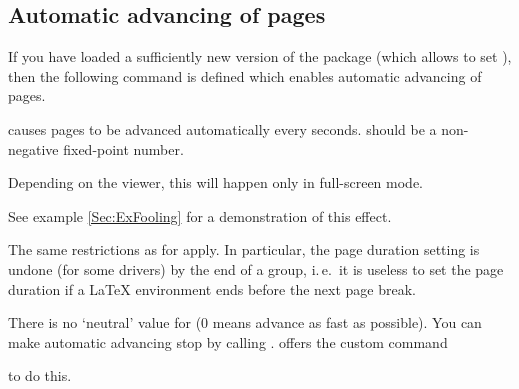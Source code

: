   \newslide

  \subsection{Automatic advancing of pages}\label{Sec:PageDuration}
  If you have loaded a sufficiently new version of the
  \href{ftp://ftp.dante.de/tex-archive/help/Catalogue/entries/hyperref.html}{} package (which allows to
  set ), then the following command is defined which enables automatic advancing of 
  pages.

   causes pages to be advanced automatically every 
  seconds.  should be a non-negative fixed-point number.

  \pause

  Depending on the  viewer, this will happen only in full-screen mode.

  See example \ref{Sec:ExFooling} for a demonstration of this effect.

  \stopAdvancing
  
  \newslide
  
  The same restrictions as for  apply. In particular, the page duration setting is undone (for
  some drivers) by the end of a group, i.\,e.\ it is useless to set the page duration if a \LaTeX{} environment ends
  before the next page break.
  
  There is no `neutral' value for  ($0$ means advance as fast as possible). You can make automatic advancing
  stop by calling .  offers the custom command
  \begin{center}
  \end{center}
  to do this.

  \newslide

